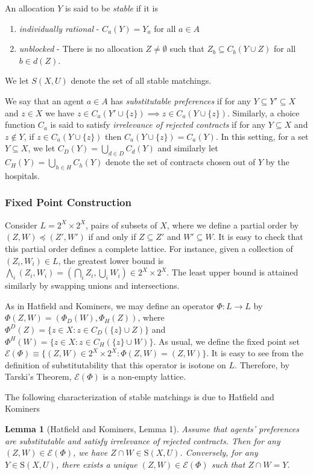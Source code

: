 \documentclass[11pt,reqno]{amsart}
\newtheorem{lemma}[thm]{Lemma}
\theoremstyle{definition}
\numberwithin{equation}{section}
\newcommand{\lft}{\left(}
\newcommand{\rt}{\right)}
\newcommand{\sub}{\subseteq}
\newcommand{\stable}{\mathrm{S}(X,U)}
\newcommand{\fix}{\mathcal{E}}
\newcommand{\peq}{\preceq}
\newcommand{\lattice}{L}
\begin{document}
An allocation $Y$ is said to be \emph{stable} if it is 
\begin{enumerate}
\item \emph{individually rational} - $C_a(Y) = Y_a$ for all $a \in A$
\item \emph{unblocked} - There is no allocation $Z \not = \emptyset$ such that $Z_b \sub C_b(Y\cup Z)$ for all $b \in d(Z)$. 
\end{enumerate}
We let $S(X,U)$ denote the set of all stable matchings.

We say that an agent $a \in A$ has \emph{substitutable preferences} if for any $Y \sub Y' \sub X$ and $z \in X$ we have $z \in C_a(Y' \cup \{ z \}) \implies z \in C_a(Y \cup \{z \})$. 
Similarly, a choice function $C_a$ is said to satisfy \emph{irrelevance of rejected contracts} if for any $Y \sub X$ and $z \not \in Y$, if $z \in C_a(Y \cup \{ z \})$ then $C_a(Y \cup \{z\}) = C_a(Y)$.
In this setting, for a set $Y \sub X$, we let $C_D(Y) = \bigcup_{d \in D} C_d(Y)$ and similarly let $C_H(Y) = \bigcup_{h \in H} C_h(Y)$ denote the set of contracts chosen out of $Y$ by the hospitals.

\subsubsection{Fixed Point Construction}
Consider $\lattice = 2^X \times 2^X$, pairs of subsets of $X$, where we define a partial order by $(Z,W) \peq (Z',W')$ if and only if $Z \sub Z'$ and $W' \sub W$. 
It is easy to check that this partial order defines a complete lattice.
For instance, given a collection of $(Z_i, W_i) \in \lattice$, the greatest lower bound is $\bigwedge_i (Z_i, W_i) = \lft \bigcap_i Z_i, \bigcup_i W_i \rt \in 2^X \times 2^X$.
The least upper bound is attained similarly by swapping unions and intersections. 

As in Hatfield and Kominers, we may define an operator $\Phi: \lattice \to \lattice$ by $\Phi(Z,W) = (\Phi_D(W), \Phi_H(Z))$, where $\Phi^D(Z) = \{z \in X: z \in C_D(\{z \} \cup Z) \}$ and $\Phi^H(W) = \{z \in X: z \in C_H(\{z \} \cup W) \}$.
As usual, we define the fixed point set $\fix(\Phi) \equiv \{(Z,W) \in 2^X \times 2^X: \Phi(Z,W) = (Z,W) \}$.
It is easy to see from the definition of substitutability that this operator is isotone on $\lattice$.
Therefore, by Tarski's Theorem, $\fix(\Phi)$ is a non-empty lattice.

The following characterization of stable matchings is due to Hatfield and Kominers
\begin{lemma}[Hatfield and Kominers, Lemma 1] \label{lemma:hk}
Assume that agents' preferences are substitutable and satisfy irrelevance of rejected contracts.
Then for any $(Z,W) \in \fix(\Phi)$, we have $Z\cap W \in \stable$.
Conversely, for any $Y\in \stable$, there exists a unique $(Z,W) \in \fix(\Phi)$ such that $Z \cap W = Y$.
\end{lemma}
\end{document}
